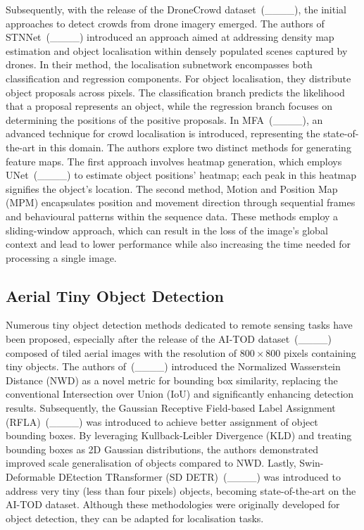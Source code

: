 Subsequently, with the release of the DroneCrowd dataset~(____), the initial approaches to detect crowds from drone imagery emerged. The authors of STNNet~(____) introduced an approach aimed at addressing density map estimation and object localisation within densely populated scenes captured by drones. In their method, the localisation subnetwork encompasses both classification and regression components. For object localisation, they distribute object proposals across pixels. The classification branch predicts the likelihood that a proposal represents an object, while the regression branch focuses on determining the positions of the positive proposals. In MFA~(____), an advanced technique for crowd localisation is introduced, representing the state-of-the-art in this domain. The authors explore two distinct methods for generating feature maps. The first approach involves heatmap generation, which employs UNet~(____) to estimate object positions' heatmap; each peak in this heatmap signifies the object's location. The second method, Motion and Position Map (MPM) encapsulates position and movement direction through sequential frames and behavioural patterns within the sequence data. These methods employ a sliding-window approach, which can result in the loss of the image's global context and lead to lower performance while also increasing the time needed for processing a single image.

\subsection{Aerial Tiny Object Detection}

Numerous tiny object detection methods dedicated to remote sensing tasks have been proposed, especially after the release of the AI-TOD dataset~(____) composed of tiled aerial images with the resolution of $800\times800$ pixels containing tiny objects. The authors of~(____) introduced the Normalized Wasserstein Distance (NWD) as a novel metric for bounding box similarity, replacing the conventional Intersection over Union (IoU) and significantly enhancing detection results. Subsequently, the Gaussian Receptive Field-based Label Assignment (RFLA)~(____) was introduced to achieve better assignment of object bounding boxes. By leveraging Kullback-Leibler Divergence (KLD) and treating bounding boxes as 2D Gaussian distributions, the authors demonstrated improved scale generalisation of objects compared to NWD. Lastly, Swin-Deformable DEtection TRansformer (SD DETR)~(____) was introduced to address very tiny (less than four pixels) objects, becoming state-of-the-art on the AI-TOD dataset. Although these methodologies were originally developed for object detection, they can be adapted for localisation tasks.

